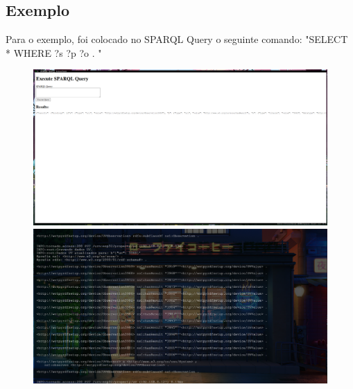 \subsection{Exemplo}

Para o exemplo, foi colocado no SPARQL Query o seguinte comando: "SELECT * WHERE { ?s ?p ?o . }"

\begin{figure}[htpb]
    \centering
    \includegraphics[scale=0.3]{figures/example1.png}
    \includegraphics[scale=0.3]{figures/example2.png}
\end{figure}



